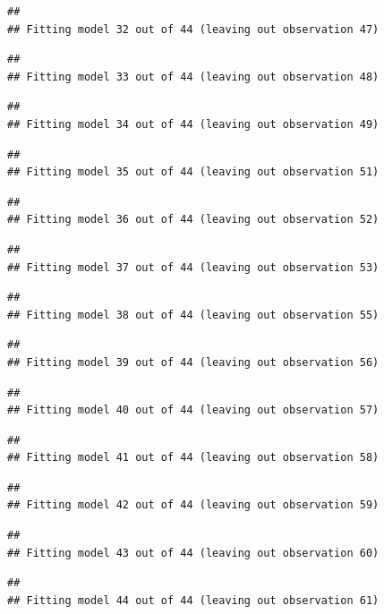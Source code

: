 \documentclass[]{article}
\begin{document}
\begin{verbatim}
## 
## Fitting model 32 out of 44 (leaving out observation 47)
\end{verbatim}

\begin{verbatim}
## 
## Fitting model 33 out of 44 (leaving out observation 48)
\end{verbatim}

\begin{verbatim}
## 
## Fitting model 34 out of 44 (leaving out observation 49)
\end{verbatim}

\begin{verbatim}
## 
## Fitting model 35 out of 44 (leaving out observation 51)
\end{verbatim}

\begin{verbatim}
## 
## Fitting model 36 out of 44 (leaving out observation 52)
\end{verbatim}

\begin{verbatim}
## 
## Fitting model 37 out of 44 (leaving out observation 53)
\end{verbatim}

\begin{verbatim}
## 
## Fitting model 38 out of 44 (leaving out observation 55)
\end{verbatim}

\begin{verbatim}
## 
## Fitting model 39 out of 44 (leaving out observation 56)
\end{verbatim}

\begin{verbatim}
## 
## Fitting model 40 out of 44 (leaving out observation 57)
\end{verbatim}

\begin{verbatim}
## 
## Fitting model 41 out of 44 (leaving out observation 58)
\end{verbatim}

\begin{verbatim}
## 
## Fitting model 42 out of 44 (leaving out observation 59)
\end{verbatim}

\begin{verbatim}
## 
## Fitting model 43 out of 44 (leaving out observation 60)
\end{verbatim}

\begin{verbatim}
## 
## Fitting model 44 out of 44 (leaving out observation 61)
\end{verbatim}
\end{document}
